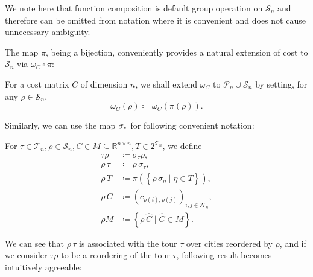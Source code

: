 \documentclass[index=totoc,bibliography=totoc]{scrartcl}
\newcommand*{\Cdot}{\raisebox{-0.30ex}{\scalebox{1.5}{$\cdot$}}}
\numberwithin{equation}{section}
\numberwithin{figure}{section}
\numberwithin{table}{section}
\begin{document}
\begin{remark}
  We note here that function composition is default group operation on
  $\mathcal{S}_n$ and therefore can be omitted from notation where it is
  convenient and does not cause unnecessary ambiguity.
\end{remark}

The map $\pi$, being a bijection, conveniently provides a natural extension
of cost to $\mathcal{S}_n$ via $\omega_C \circ \pi$:
\begin{define}
  For a cost matrix $C$ of dimension $n$,
  we shall extend $\omega_C$ to $\mathcal{P}_n \cup \mathcal{S}_n$
  by setting, for any $\rho \in \mathcal{S}_n$,
  \[
    \omega_C\left(\rho\right) \coloneqq \omega_C\left(\pi\left(\rho\right)\right).
  \]
\end{define}

Similarly, we can use the map $\sigma_{\Cdot}$ for following convenient notation:
\begin{define}
\label{def:actions}
  For $\tau \in \mathcal{T}_n, \rho \in \mathcal{S}_n,
       C \in M \subseteq \mathbb{R}^{n \times n}, T \in 2^{\mathcal{T}_n}$,
  we define
  \begin{align*}
    \tau \rho & \coloneqq \sigma_\tau \rho, \\
    \rho \, \tau & \coloneqq \rho \, \sigma_\tau, \\
    \rho \, T & \coloneqq \pi\left(\left\{ \rho \, \sigma_\eta \mid \eta \in T \right\}\right), \\
    \rho \, C & \coloneqq \left(c_{\rho\left(i\right),\rho\left(j\right)}\right)_{i,j \in \mathcal{N}_n}, \\
    \rho M & \coloneqq \left\{ \rho \, \widehat{C} \mid \widehat{C} \in M \right\}.
  \end{align*}
\end{define}

We can see that $\rho \, \tau$ is associated with the tour $\tau$ over
cities reordered by $\rho$, and if we consider $\tau \rho$ to be a
reordering of the tour $\tau$, following result becomes intuitively
agreeable:
\end{document}
